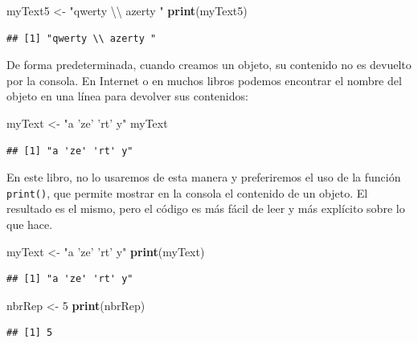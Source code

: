\documentclass[
]{book}
\newenvironment{Shaded}{\begin{snugshade}}{\end{snugshade}}
\newcommand{\CharTok}[1]{\textcolor[rgb]{0.31,0.60,0.02}{#1}}
\newcommand{\DecValTok}[1]{\textcolor[rgb]{0.00,0.00,0.81}{#1}}
\newcommand{\KeywordTok}[1]{\textcolor[rgb]{0.13,0.29,0.53}{\textbf{#1}}}
\newcommand{\NormalTok}[1]{#1}
\newcommand{\StringTok}[1]{\textcolor[rgb]{0.31,0.60,0.02}{#1}}
\begin{document}
\begin{Shaded}
\begin{Highlighting}[]
\NormalTok{myText5 <-}\StringTok{ "qwerty }\CharTok{\textbackslash{}\textbackslash{}}\StringTok{ azerty "}
\KeywordTok{print}\NormalTok{(myText5)}
\end{Highlighting}
\end{Shaded}

\begin{verbatim}
## [1] "qwerty \\ azerty "
\end{verbatim}

De forma predeterminada, cuando creamos un objeto, su contenido no es devuelto por la consola. En Internet o en muchos libros podemos encontrar el nombre del objeto en una línea para devolver sus contenidos:

\begin{Shaded}
\begin{Highlighting}[]
\NormalTok{myText <-}\StringTok{ "a 'ze' 'rt' y"}
\NormalTok{myText}
\end{Highlighting}
\end{Shaded}

\begin{verbatim}
## [1] "a 'ze' 'rt' y"
\end{verbatim}

En este libro, no lo usaremos de esta manera y preferiremos el uso de la función \texttt{print()}, que permite mostrar en la consola el contenido de un objeto. El resultado es el mismo, pero el código es más fácil de leer y más explícito sobre lo que hace.

\begin{Shaded}
\begin{Highlighting}[]
\NormalTok{myText <-}\StringTok{ "a 'ze' 'rt' y"}
\KeywordTok{print}\NormalTok{(myText)}
\end{Highlighting}
\end{Shaded}

\begin{verbatim}
## [1] "a 'ze' 'rt' y"
\end{verbatim}

\begin{Shaded}
\begin{Highlighting}[]
\NormalTok{nbrRep <-}\StringTok{ }\DecValTok{5}
\KeywordTok{print}\NormalTok{(nbrRep)}
\end{Highlighting}
\end{Shaded}

\begin{verbatim}
## [1] 5
\end{verbatim}
\end{document}
